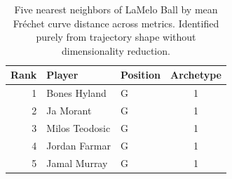 \begin{table}[htbp]
  \centering\small
  \begin{tabular}{rllc}
    \toprule
    Rank & Player & Position & Archetype \\
    \midrule
    1 & Bones Hyland & G & 1 \\
    2 & Ja Morant & G & 1 \\
    3 & Milos Teodosic & G & 1 \\
    4 & Jordan Farmar & G & 1 \\
    5 & Jamal Murray & G & 1 \\
    \bottomrule
  \end{tabular}
  \caption{Five nearest neighbors of LaMelo Ball by mean Fr\'{e}chet curve distance across metrics. Identified purely from trajectory shape without dimensionality reduction.}
  \label{tab:LaMelo_Ball_frechet_curve_neighbors}
\end{table}

